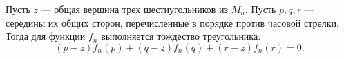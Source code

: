 \begin{suggestion} \label{3.1a}
Пусть $z$ --- общая вершина трех шестиугольников из $M_n$.
Пусть $p,q,r$ --- середины их общих сторон, перечисленные в порядке против часовой стрелки. Тогда для функции $f_n$ выполняется тождество треугольника:
\begin{equation}\label{eq-l-discrete-analiticity}
    (p-z)f_n(p)+(q-z)f_n(q)+(r-z)f_n(r)=0.
\end{equation}
\end{suggestion}
